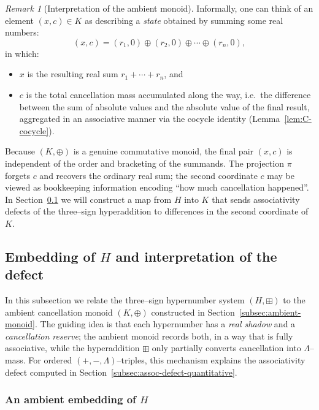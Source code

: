 \documentclass[11pt]{amsart}
\numberwithin{equation}{section}
\theoremstyle{definition}
\theoremstyle{remark}
\newtheorem{remark}[theorem]{Remark}
\newcommand{\Hnum}{H}                      %
\newcommand{\Kamb}{K}                      %
\newcommand{\op}{\boxplus}                 %
\begin{document}
\begin{remark}[Interpretation of the ambient monoid]\label{rem:Kamb-intuition}
Informally, one can think of an element $(x,c)\in\Kamb$ as describing a
\emph{state} obtained by summing some real numbers:
\[
  (x,c)
  = (r_1,0)\oplus(r_2,0)\oplus\cdots\oplus(r_n,0),
\]
in which:
\begin{itemize}[leftmargin=2em]
  \item $x$ is the resulting real sum $r_1+\cdots+r_n$, and
  \item $c$ is the total cancellation mass accumulated along the way,
        i.e.\ the difference between the sum of absolute values and
        the absolute value of the final result, aggregated in an
        associative manner via the cocycle identity
        (Lemma~\ref{lem:C-cocycle}).
\end{itemize}
Because $(\Kamb,\oplus)$ is a genuine commutative monoid, the final
pair $(x,c)$ is independent of the order and bracketing of the
summands.  The projection $\pi$ forgets $c$ and recovers the ordinary
real sum; the second coordinate $c$ may be viewed as bookkeeping
information encoding ``how much cancellation happened''.  In
Section~\ref{subsec:ambient-link-H} we will construct a map from
$\Hnum$ into $\Kamb$ that sends associativity defects of the
three--sign hyperaddition to differences in the second coordinate of
$\Kamb$.
\end{remark}

\subsection{Embedding of $\Hnum$ and interpretation of the defect}
\label{subsec:ambient-link-H}

In this subsection we relate the three--sign hypernumber system
$(\Hnum,\op)$ to the ambient cancellation monoid
$(\Kamb,\oplus)$ constructed in
Section~\ref{subsec:ambient-monoid}.  The guiding idea is that each
hypernumber has a \emph{real shadow} and a \emph{cancellation reserve};
the ambient monoid records both, in a way that is fully associative,
while the hyperaddition $\op$ only partially converts cancellation
into $\Lambda$--mass.  For ordered $(+,-,\Lambda)$--triples, this
mechanism explains the associativity defect computed in
Section~\ref{subsec:assoc-defect-quantitative}.

\subsubsection*{An ambient embedding of $\Hnum$}
\end{document}
